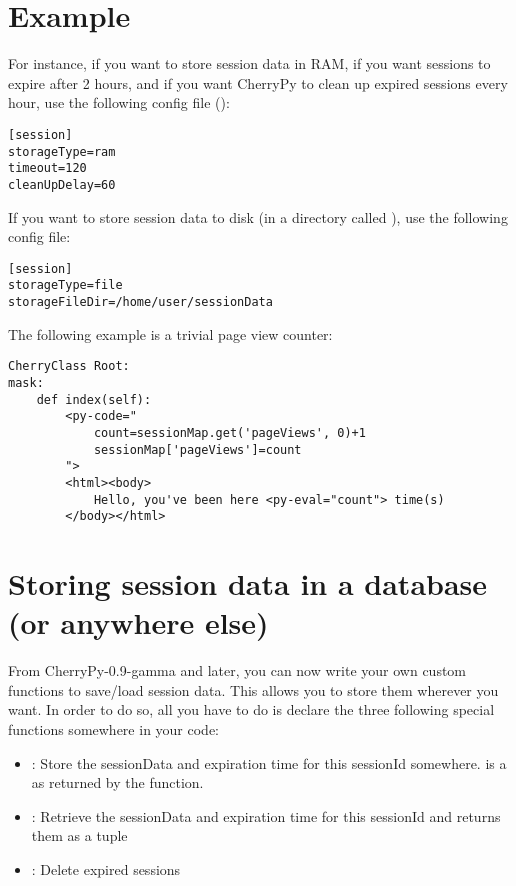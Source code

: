 \documentclass{manual}
\begin{document}
\section{Example}
For instance, if you want to store session data in RAM, if you want sessions to expire after 2 hours, and if you want CherryPy to clean up expired
sessions every hour, use the following config file ():
\begin{verbatim}
[session]
storageType=ram
timeout=120
cleanUpDelay=60
\end{verbatim}
If you want to store session data to disk (in a directory called ), use the following
config file:
\begin{verbatim}
[session]
storageType=file
storageFileDir=/home/user/sessionData
\end{verbatim}

The following example is a trivial page view counter:
\begin{verbatim}
CherryClass Root:
mask:
    def index(self):
        <py-code="
            count=sessionMap.get('pageViews', 0)+1
            sessionMap['pageViews']=count
        ">
        <html><body>
            Hello, you've been here <py-eval="count"> time(s)
        </body></html>
\end{verbatim}

\section{Storing session data in a database (or anywhere else)}
From CherryPy-0.9-gamma and later, you can now write your own custom functions to save/load session data. This allows you to store them wherever you want.
In order to do so, all you have to do is declare the three following special functions somewhere in your code:
\begin{itemize}
\item
{}: Store the sessionData and expiration time for this sessionId somewhere.  is a  as returned by the  function.
\item
{}: Retrieve the sessionData and expiration time for this sessionId and returns them as a tuple
\item
{}: Delete expired sessions
\end{itemize}
\end{document}
